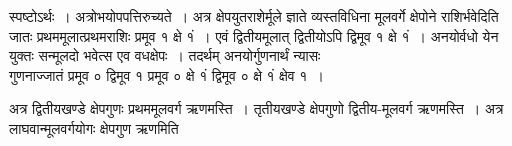 \documentclass[11pt, openany]{book}
\begin{document}
\begin{sloppypar}
स्पष्टोऽर्थः~। अत्रोभयोपपत्तिरुच्यते~। अत्र क्षेपयुतराशेर्मूले ज्ञाते व्यस्तविधिना मूलवर्गे क्षेपोने राशिर्भवेदिति जातः प्रथममूलात्प्रथमराशिः प्रमूव १ क्षे १ं~। एवं द्वितीयमूलात् द्वितीयोऽपि द्विमूव १ क्षे १ं~। अनयोर्वधो येन युक्तः सन्मूलदो भवेत्स एव वधक्षेपः~। तदर्थम् अनयोर्गुणनार्थं न्यासः  \\

गुणनाज्जातं प्रमूव ० द्विमूव १ प्रमूव ० क्षे १ं द्विमूव ० क्षे १ं क्षेव १~।\\
\vspace{-1mm}

अत्र द्वितीयखण्डे क्षेपगुणः प्रथममूलवर्ग ऋणमस्ति~। तृतीयखण्डे क्षेपगुणो द्वितीय-मूलवर्ग ऋणमस्ति~। अत्र लाघवान्मूलवर्गयोगः क्षेपगुण ऋणमिति
\end{sloppypar}

\newpage
\end{document}
